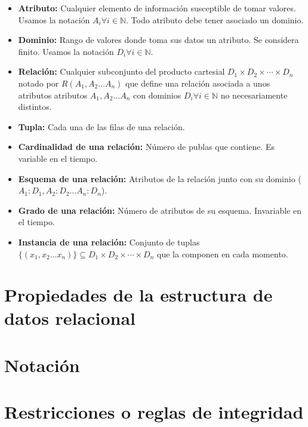 \begin{itemize}
	\item\textbf{Atributo:} Cualquier elemento de información susceptible de tomar valores. Usamos la notación $A_i\forall i\in\mathbb{N}$. Todo atributo debe tener asociado un dominio.
	\item\textbf{Dominio:} Rango de valores donde toma sus datos un atributo. Se considera finito. Usamos la notación $D_i\forall i\in\mathbb{N}$.
	\item\textbf{Relación:} Cualquier subconjunto del producto cartesial $D_1\times D_2\times\cdots\times D_n$ notado por $R(A_1,A_2 \ldots A_n)$ que define una relación asociada a unos atributos atributos $A_1,A_2\ldots A_n$ con dominios $D_i\forall i\in\mathbb{N}$ no necesariamente distintos.
	\item\textbf{Tupla:} Cada una de las filas de una relación.
	\item\textbf{Cardinalidad de una relación:} Número de publas que contiene. Es variable en el tiempo.
	\item\textbf{Esquema de una relación:} Atributos de la relación junto con su dominio ($A_1:D_1,A_2:D_2\ldots A_n:D_n$).
	\item\textbf{Grado de una relación:} Número de atributos de su esquema. Invariable en el tiempo.
	\item\textbf{Instancia de una relación:} Conjunto de tuplas $\{(x_1,x_2\ldots x_n)\}\subseteq D_1\times D_2\times\cdots\times D_n$ que la componen en cada momento.
\end{itemize}

\section{Propiedades de la estructura de datos relacional}



\section{Notación}

\section{Restricciones o reglas de integridad}
